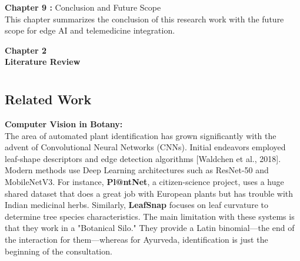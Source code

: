 \documentclass[12pt, a4paper]{report}
\begin{document}
\item {\textbf{Chapter 9 : }} Conclusion and Future Scope\\
This chapter summarizes the conclusion of this research work with the future scope for edge AI and telemedicine integration.

\newpage
\vspace*{\fill}
\begin{center}
\textbf{\Huge{Chapter 2}}\\
\vspace{5mm}
\textbf{\Huge{Literature Review}}
\end{center}
\vspace*{\fill}
\newpage
\titleformat{\chapter}[block]{\normalfont}{}{0pt}{}
\titlespacing{\chapter}{0pt}{-2em}{0pt}
\chapter[Literature Review]{}
\titleformat{\chapter}[display]{\vspace{1cm}\normalfont\Large\bfseries\centering}{\chaptertitlename\ \thechapter}{20pt}{\vspace{0pt}}
\titlespacing*{\chapter}{0pt}{-50pt}{20pt}
\justify
\section{Related Work}

\item \textbf{Computer Vision in Botany:} \\
The area of automated plant identification has grown significantly with the advent of Convolutional Neural Networks (CNNs). Initial endeavors employed leaf-shape descriptors and edge detection algorithms [Waldchen et al., 2018]. Modern methods use Deep Learning architectures such as ResNet-50 and MobileNetV3. For instance, \textbf{Pl@ntNet}, a citizen-science project, uses a huge shared dataset that does a great job with European plants but has trouble with Indian medicinal herbs. Similarly, \textbf{LeafSnap} focuses on leaf curvature to determine tree species characteristics. The main limitation with these systems is that they work in a "Botanical Silo." They provide a Latin binomial—the end of the interaction for them—whereas for Ayurveda, identification is just the beginning of the consultation.
\end{document}
